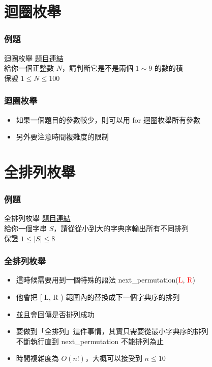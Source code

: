 \documentclass{beamer}
\begin{document}
\section{迴圈枚舉}

\begin{frame}
    \frametitle{例題}
    \begin{block}{迴圈枚舉}
        \href{https://atcoder.jp/contests/abc144/tasks/abc144_b}{題目連結}\\
        給你一個正整數 $N$，請判斷它是不是兩個 $1 \sim 9$ 的數的積\\
        保證 $1 \leq N \leq 100$
    \end{block}
\end{frame}

\begin{frame}
    \frametitle{迴圈枚舉}
    \begin{itemize}
        \item 如果一個題目的參數較少，則可以用 for 迴圈枚舉所有參數
        \item 另外要注意時間複雜度的限制
    \end{itemize}
\end{frame}

\section{全排列枚舉}

\begin{frame}
    \frametitle{例題}
    \begin{block}{全排列枚舉}
        \href{https://cses.fi/problemset/task/1622}{題目連結}\\
        給你一個字串 $S$，請從從小到大的字典序輸出所有不同排列\\
        保證 $1 \leq |S| \leq 8$
    \end{block}
\end{frame}

\begin{frame}
    \frametitle{全排列枚舉}
    \begin{itemize}
        \item 這時候需要用到一個特殊的語法  next\_permutation(\textcolor{red}{L}, \textcolor{red}{R})
        \item 他會把 [ L, R ) 範圍內的替換成下一個字典序的排列
        \item 並且會回傳是否排列成功
        \vspace{0.5cm}
        \item<2-> 要做到「全排列」這件事情，其實只需要從最小字典序的排列\\
        不斷執行直到 next\_permutation 不能排列為止
        \item<2-> 時間複雜度為 $O(n!)$，大概可以接受到 $n \leq 10$
    \end{itemize}
\end{frame}
\end{document}

